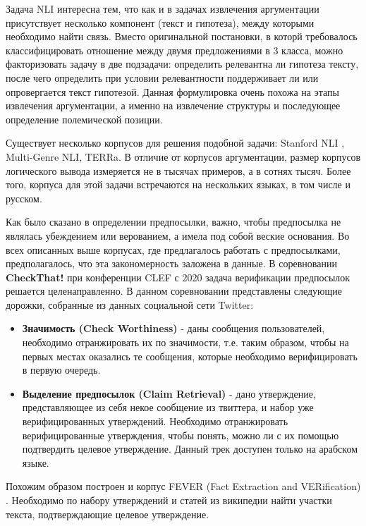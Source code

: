 Задача NLI интересна тем, что как и в задачах извлечения аргументации присутствует несколько компонент (текст и гипотеза), между которыми необходимо найти связь. Вместо оригинальной постановки, в которй требовалось классифицировать отношение между двумя предложениями в 3 класса, можно факторизовать задачу в две подзадачи: определить релевантна ли гипотеза тексту, после чего определить при условии релевантности поддерживает ли или опровергается текст гипотезой. Данная формулировка очень похожа на этапы извлечения аргументации, а именно на извлечение структуры и последующее определение полемической позиции.

Существует несколько корпусов для решения подобной задачи: Stanford NLI \cite{snli:emnlp2015}, Multi-Genre NLI, TERRa. В отличие от корпусов аргументации, размер корпусов логического вывода измеряется не в тысячах примеров, а в сотнях тысяч. Более того, корпуса для этой задачи встречаются на нескольких языках, в том числе и русском.

Как было сказано в определении предпосылки, важно, чтобы предпосылка не являлась убеждением или верованием, а имела под собой веские основания. Во всех описанных выше корпусах, где предлагалось работать с предпосылками, предполагалось, что эта закономерность заложена в данные. В соревновании \textbf{CheckThat!} \cite{barron2020overview} при конференции CLEF с 2020 задача верификации предпосылок решается целенаправленно. В данном соревновании представлены следующие дорожки, собранные из данных социальной сети Twitter:
\begin{itemize}
    \item \textbf{Значимость (Check Worthiness)} - даны сообщения пользователей, необходимо отранжировать их по значимости, т.е. таким образом, чтобы на первых местах оказались те сообщения, которые необходимо верифицировать в первую очередь.
    \item \textbf{Выделение предпосылок (Claim Retrieval)} - дано утверждение, представляющее из себя некое сообщение из твиттера, и набор уже верифицированных утверждений. Необходимо отранжировать верифицированные утверждения, чтобы понять, можно ли с их помощью подтвердить целевое утверждение. Данный трек доступен только на арабском языке.
\end{itemize}

Похожим образом построен и корпус FEVER (Fact Extraction and VERification) \cite{thorne2018fever}. Необходимо по набору утверждений и статей из википедии найти участки текста, подтверждающие целевое утверждение.

